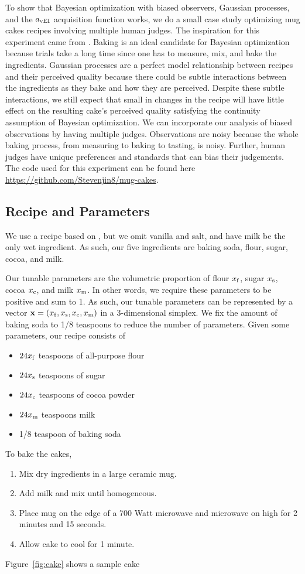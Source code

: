 To show that Bayesian optimization with biased observers, Gaussian processes, and the $a_{\vei}$ acquisition function works,
we do a small case study optimizing mug cakes recipes involving multiple human judges.
The inspiration for this experiment came from \cite{Solnik2017}.
Baking is an ideal candidate for Bayesian optimization because
trials take a long time since one has to measure, mix, and bake the ingredients.
Gaussian processes are a perfect model relationship between recipes and their perceived quality because there could be subtle interactions between the ingredients as they bake and how they are perceived.
Despite these subtle interactions, we still expect that small in changes in the recipe will have little effect on the resulting cake's perceived quality satisfying the continuity assumption of Bayesian optimization.
We can incorporate our analysis of biased observations by having multiple judges.
Observations are noisy because the whole baking process, from measuring to baking to tasting, is noisy.
Further, human judges have unique preferences and standards that can bias their judgements.
The code used for this experiment can be found here \url{https://github.com/Stevenjin8/mug-cakes}.

\subsection{Recipe and Parameters}\label{ssec:recip}

We use a recipe based on \cite{mugcake}, but we omit vanilla and salt, and have milk be the only wet ingredient.
As such, our five ingredients are baking soda, flour, sugar, cocoa, and milk.

Our tunable parameters are the volumetric proportion of flour $x_\ff$, sugar $x_\ss$, cocoa $x_\cc$, and milk $x_\mm$.
In other words, we require these parameters to be positive and sum to 1.
As such, our tunable parameters can be represented by a vector $\mathbf{x} = (x_\ff, x_\ss, x_\cc,x_\mm)$ in a 3-dimensional simplex.
We fix the amount of baking soda to 1/8 teaspoons to reduce the number of parameters.
Given some parameters, our recipe consists of
\begin{itemize}
    \item $24x_\ff$ teaspoons of all-purpose flour
    \item $24x_\ss$ teaspoons of sugar
    \item $24x_\cc$ teaspoons of cocoa powder
    \item $24x_\mm$ teaspoons milk
    \item 1/8 teaspoon of baking soda
\end{itemize}
To bake the cakes,
\begin{enumerate}
    \item Mix dry ingredients in a large ceramic mug.
    \item Add milk and mix until homogeneous.
    \item Place mug on the edge of a 700 Watt microwave and microwave on high for 2 minutes and 15 seconds.
    \item Allow cake to cool for 1 minute.
\end{enumerate}
Figure~\ref{fig:cake} shows a sample cake

